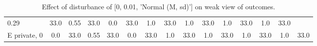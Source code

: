\begin{table}
\begin{tabular}{l|cc|cc|cc|cc|cc|cc|cc}
\cellcolor{Bittersweet}0.29&\cellcolor{Bittersweet}33.0&\cellcolor{Bittersweet}0.55&\cellcolor{Bittersweet}33.0&\cellcolor{Bittersweet}0.0&\cellcolor{Bittersweet}33.0&\cellcolor{Bittersweet}1.0&\cellcolor{Bittersweet}33.0&\cellcolor{Bittersweet}1.0&\cellcolor{Bittersweet}33.0&\cellcolor{Bittersweet}1.0&\cellcolor{Bittersweet}33.0&\cellcolor{Bittersweet}1.0&\cellcolor{Bittersweet}33.0\\E private, 0 & \cellcolor{Bittersweet}0.0&\cellcolor{Bittersweet}33.0&\cellcolor{Bittersweet}0.55&\cellcolor{Bittersweet}33.0&\cellcolor{Bittersweet}0.0&\cellcolor{Bittersweet}33.0&\cellcolor{Bittersweet}1.0&\cellcolor{Bittersweet}33.0&\cellcolor{Bittersweet}1.0&\cellcolor{Bittersweet}33.0&\cellcolor{Bittersweet}1.0&\cellcolor{Bittersweet}33.0&\cellcolor{Bittersweet}1.0&\cellcolor{Bittersweet}33.0\\\bottomrule\end{tabular}\caption{Effect of disturbance of [0, 0.01, 'Normal (M, sd)'] on weak view of outcomes.}\end{table}